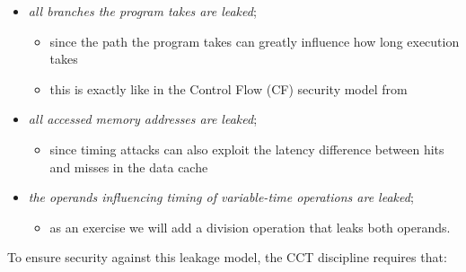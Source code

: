 \documentclass[12pt]{report}
\begin{document}
\begin{itemize}
\item  \textit{all branches the program takes are leaked};

\begin{itemize}
\item  since the path the program takes can greatly
        influence how long execution takes

\item  this is exactly like in the Control Flow (CF)
        security model from 

\end{itemize}

\item  \textit{all accessed memory addresses are leaked};

\begin{itemize}
\item  since timing attacks can also exploit the latency difference between
        hits and misses in the data cache

\end{itemize}

\item  \textit{the operands influencing timing of variable-time operations are leaked};

\begin{itemize}
\item  as an exercise we will add a division operation that leaks both operands.

\end{itemize}

\end{itemize}


 To ensure security against this leakage model, the CCT discipline requires that:
\end{document}
